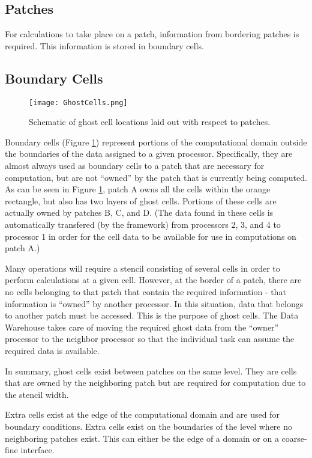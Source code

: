 \subsection{Patches}
For calculations to take place on a patch, information from bordering patches is 
required. This information is stored in boundary cells. 

\subsection{Boundary Cells}
\begin{figure}
  \centering
  \texttt{[image: GhostCells.png]}
  \caption{Schematic of ghost cell locations laid out with respect to patches.}
  \label{Fig:GhostCells}
\end{figure}

Boundary cells (Figure \ref{Fig:GhostCells}) represent portions of the computational 
domain outside the boundaries of the data assigned to a given processor. Specifically, 
they are almost always used as boundary cells to a patch that are necessary for 
computation, but are not ``owned'' by the patch that is currently being computed. As 
can be seen in Figure \ref{Fig:GhostCells}, patch A owns all the cells within the 
orange rectangle, but also has two layers of ghost cells. Portions of these cells 
are actually owned by patches B, C, and D. (The data found in these cells is 
automatically transfered (by the framework) from processors 2, 3, and 4 to processor 
1 in order for the cell data to be available for use in computations on patch A.)

Many operations will require a stencil consisting of several cells in order to 
perform calculations at a given cell. However, at the border of a patch, there 
are no cells belonging to that patch that contain the required information - that 
information is ``owned'' by another processor.  In this situation, data that 
belongs to another patch must be accessed. This is the purpose of ghost cells. The 
Data Warehouse takes care of moving the required ghost data from the ``owner'' 
processor to the neighbor processor so that the individual task can assume the 
required data is available. 

In summary, ghost cells exist between patches on the same level.  They are cells 
that are owned by the neighboring patch but are required for computation due to 
the stencil width.

Extra cells exist at the edge of the computational domain and are used for 
boundary conditions.  Extra cells exist on the boundaries of the level where 
no neighboring patches exist. This can either be the edge of a domain or 
on a coarse-fine interface.


